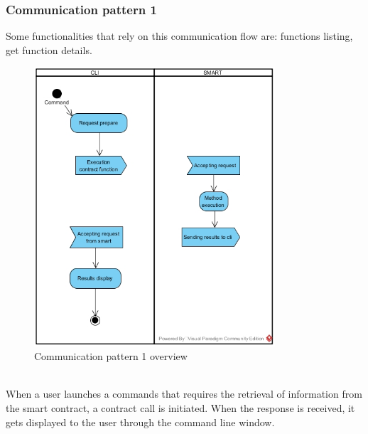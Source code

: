 \subsubsection{Communication pattern 1}
Some functionalities that rely on this communication flow are: functions listing, get function details.
\begin{figure}[h]
	\centering
	\includegraphics[width=0.8\textwidth]{res/img/pattern2.jpg}
	\caption{Communication pattern 1 overview}
\end{figure}\\
\noindent When a user launches a commands that requires the retrieval of information from the smart contract, a contract call is initiated. When the response is received, it gets displayed to the user through the command line window.\newline
\newpage
